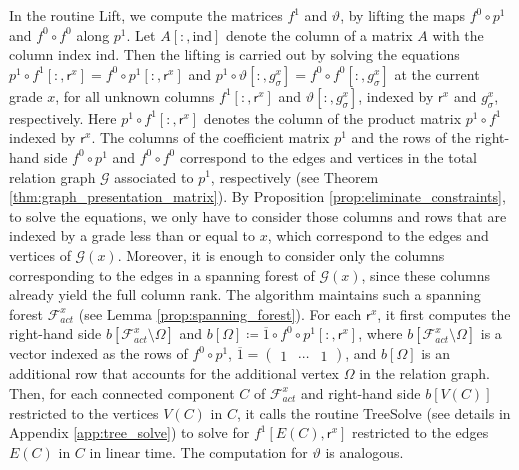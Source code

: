 \documentclass[english,a4paper,nolineno,cleveref]{socg-lipics-v2021}
\def\rsf{\mathsf{r}}
\begin{document}
In the routine {\sc Lift}, we compute the matrices $f^1$ and $\vartheta$, by lifting the maps $f^0\circ p^1$ and $f^0\circ f^0$ along $p^1$. Let $A[:,\text{ind}]$ denote the column of a matrix $A$ with the column index $\text{ind}$. Then the lifting is carried out by solving the equations $p^1\circ f^1[:,\rsf^{x}]=f^0\circ p^1[:,\rsf^{x}]$ and $p^1\circ\vartheta[:,g_\sigma^x]=f^0\circ f^0[:,g_\sigma^x]$ at the current grade $x$, for all unknown columns $f^1[:,\rsf^{x}]$ and $\vartheta[:,g_\sigma^x]$, indexed by $\rsf^x$ and $g_\sigma^x$, respectively. Here $p^1\circ f^1[:,\rsf^{x}]$ denotes the column of the product matrix $p^1\circ f^1$ indexed by $\rsf^x$. The columns of the coefficient matrix $p^1$ and the rows of the right-hand side $f^0\circ p^1$ and $f^0\circ f^0$ correspond to the edges and vertices in the total relation graph $\mathcal{G}$ associated to $p^1$, respectively (see Theorem \ref{thm:graph_presentation_matrix}). By Proposition \ref{prop:eliminate_constraints}, to solve the equations, we only have to consider those columns and rows that are indexed by a grade less than or equal to $x$, which correspond to the edges and vertices of $\mathcal{G}(x)$. Moreover, it is enough to consider only the columns corresponding to the edges in a spanning forest of $\mathcal{G}(x)$, since these columns already yield the full column rank. The algorithm maintains such a spanning forest $\mathcal{F}_{act}^x$ (see Lemma \ref{prop:spanning_forest}). For each $\rsf^{x}$, it first computes the right-hand side $b[\mathcal{F}^x_{act}\setminus\Omega]$ and $b[\Omega]\coloneqq\overline{1}\circ f^0\circ p^1[:,\rsf^{x}]$, where $b[\mathcal{F}^x_{act}\setminus\Omega]$ is a vector indexed as the rows of $f^0\circ p^1$, $\overline{1}=\begin{pmatrix}1 & \cdots & 1\end{pmatrix}$, and $b[\Omega]$ is an additional row that accounts for the additional vertex $\Omega$ in the relation graph. Then, for each connected component $C$ of $\mathcal{F}_{act}^x$ and right-hand side $b[V(C)]$ restricted to the vertices $V(C)$ in $C$, it calls the routine {\sc TreeSolve} (see details in Appendix \ref{app:tree_solve}) to solve for $f^1[E(C),\rsf^x]$ restricted to the edges $E(C)$ in $C$ in linear time. The computation for $\vartheta$ is analogous.
\end{document}
